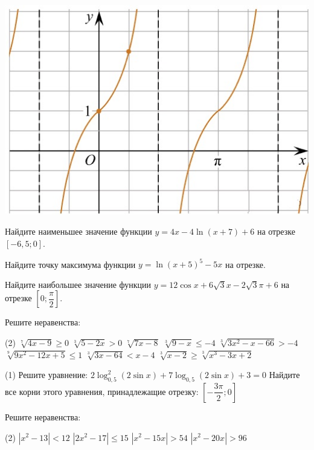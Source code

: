 \begin{homework}[number=3]
\begin{listofex}
\begin{minipage}[t]{\picwidth}
			\includegraphics[align=t, width=\linewidth]{../pics/MECGERM6H3-2.jpg}
		\end{minipage}
		\item Найдите наименьшее значение функции \( y=4x-4 \ln(x+7)+6 \) на отрезке \( [-6,5;0] \). %
		\item Найдите точку максимума функции \( y=\ln(x+5)^5-5x \) на отрезке. %
		\item Найдите наибольшее значение функции \( y=12\cos x + 6\sqrt{3} x - 2 \sqrt{3} \pi + 6 \) на отрезке \( \left[ 0; \dfrac{ \pi }{ 2 } \right]  \).
	\end{listofex}
\end{homework}

\begin{class}[number=7]
	\begin{listofex}
		\item Решите неравенства: %
		\begin{tasks}(2)
			\task \( \sqrt[ 7 ]{ 4x-9 } \ge 0 \) %
			\task \( \sqrt[ 3 ]{ 5-2x } >0 \) %
			\task \( \sqrt[ 7]{ 7x-8 } \) %
			\task \( \sqrt[ 3 ]{ 9-x } \le -4 \) %
			\task \( \sqrt[ 3 ]{ 3x^2-x-66 } > -4 \) %
			\task \( \sqrt[ 9 ]{ 9x^2-12x+5 } \le 1 \) %
			\task \( \sqrt[ 3 ]{ 3x-64 } < x-4 \) %
			\task \( \sqrt[ 3 ]{ x-2 } \ge \sqrt[ 3 ]{ x^3-3x+2 } \) %
		\end{tasks}
		\item %
		\begin{tasks}(1)
			\task Решите уравнение: \( 2\log_{0,5}^2 (2\sin x) + 7 \log_{0,5} (2\sin x) + 3 = 0 \)
			\task Найдите все корни этого уравнения, принадлежащие отрезку: \( \left[ -\dfrac{3\pi}{2};0 \right] \)
		\end{tasks}
		
		\item Решите неравенства: %
		\begin{tasks}(2)
			\task \( |x^2-13| < 12 \)
			\task \( |2x^2-17| \le 15 \)
			\task \( |x^2-15x| > 54 \)
			\task \( |x^2-20x|>96 \)
		\end{tasks}
	\end{listofex}
\end{class}

